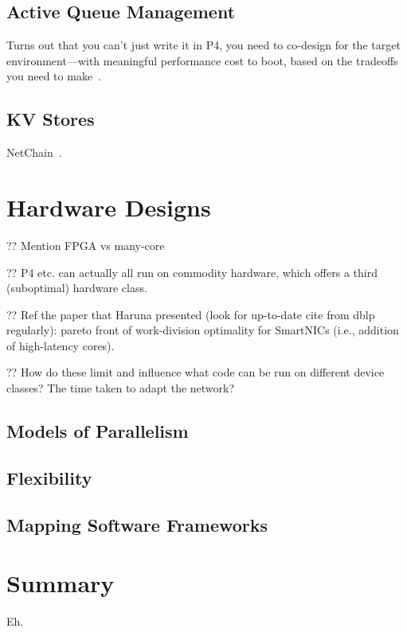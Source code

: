 \subsection{Active Queue Management}
Turns out that you can't just write it in P4, you need to co-design for the target environment---with meaningful performance cost to boot, based on the tradeoffs you need to make~\parencite{Kunze-P4-AQM}.

\subsection{KV Stores}
NetChain~\parencite{DBLP:conf/nsdi/JinLZFLSKS18}.

\section{Hardware Designs}

?? Mention FPGA vs many-core

?? P4 etc. can actually all run on commodity hardware, which offers a third (suboptimal) hardware class.

?? Ref the paper that Haruna presented \parencite{haruna-rg-paper} (look for up-to-date cite from dblp regularly): pareto front of work-division optimality for SmartNICs (i.e., addition of high-latency cores).

?? How do these limit and influence what code can be run on different device classes? The time taken to adapt the network?

\subsection{Models of Parallelism}

\subsection{Flexibility}

\subsection{Mapping Software Frameworks}

\section{Summary}
Eh. 
